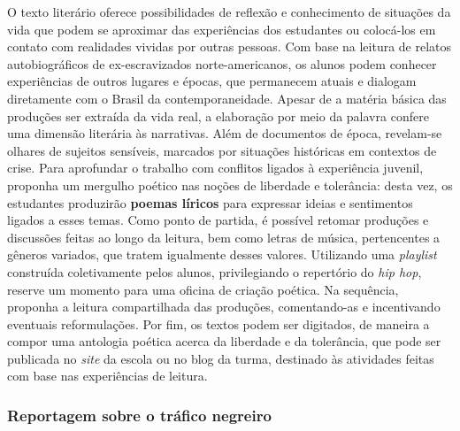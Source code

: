\documentclass[11pt]{extarticle}
\begin{document}
O texto literário oferece possibilidades de reflexão e conhecimento de
situações da vida que podem se aproximar das experiências dos
estudantes ou colocá-los em contato com realidades vividas por outras
pessoas. Com base na leitura de relatos autobiográficos de
ex-escravizados norte-americanos, os alunos podem conhecer
experiências de outros lugares e épocas, que permanecem atuais e
dialogam diretamente com o Brasil da contemporaneidade. Apesar de a
matéria básica das produções ser extraída da vida real, a elaboração
por meio da palavra confere uma dimensão literária às narrativas. Além
de documentos de época, revelam-se olhares de sujeitos sensíveis,
marcados por situações históricas em contextos de crise. Para
aprofundar o trabalho com conflitos ligados à experiência juvenil,
proponha um mergulho poético nas noções de liberdade e tolerância:
desta vez, os estudantes produzirão \textbf{poemas líricos} para
expressar ideias e sentimentos ligados a esses temas. Como ponto de
partida, é possível retomar produções e discussões feitas ao longo da
leitura, bem como letras de música, pertencentes a gêneros variados,
que tratem igualmente desses valores. Utilizando uma \emph{playlist}
construída coletivamente pelos alunos, privilegiando o repertório do
\emph{hip hop}, reserve um momento para uma oficina de criação
poética. Na sequência, proponha a leitura compartilhada das produções,
comentando-as e incentivando eventuais reformulações. Por fim, os
textos podem ser digitados, de maneira a compor uma antologia poética
acerca da liberdade e da tolerância, que pode ser publicada no
\emph{site} da escola ou no blog da turma, destinado às atividades
feitas com base nas experiências de leitura.

\subsubsection{Reportagem sobre o tráfico negreiro}
\end{document}
